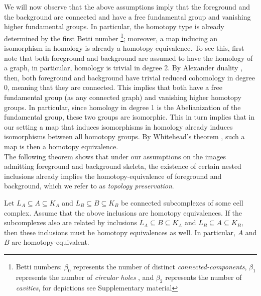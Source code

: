 

We will now observe that the above assumptions imply that the foreground and the background are connected and have a free fundamental group and vanishing higher fundamental groups.
In particular, the homotopy type is already determined by the first Betti number \footnote{Betti numbers:
	$\beta_0$ represents the number of distinct \textit{connected-components},
	$\beta_1$ represents the number of \textit{circular holes}%
	, and
	$\beta_2$ represents the number of \textit{cavities}, for depictions see Supplementary material }; moreover, a map inducing an isomorphism in homology is already a homotopy equivalence.
To see this, first note that both foreground and background are assumed to have the homology of a graph, in particular, homology is trivial in degree 2.
By Alexander duality \cite{aleksandrov1998combinatorial}, then, both foreground and background have trivial reduced cohomology in degree 0, meaning that they are connected.
This implies that both have a free fundamental group (as any connected graph) and vanishing higher homotopy groups.
In particular, since homology in degree 1 is the Abelianization of the fundamental group, these two groups are isomorphic.
This in turn implies that in our setting a map that induces isomorphisms in homology already induces isomorphisms between all homotopy groups.
By Whitehead's theorem \cite{whitehead1949combinatorial}, such a map is then a homotopy equivalence.\\

The following theorem shows that under our assumptions on the images admitting foreground and background skeleta, the existence of certain nested inclusions already implies the homotopy-equivalence of foreground and background, which we refer to as \emph{topology preservation}.

\begin{theorem}
	\label{thm2}
	Let $L_A \subseteq A \subseteq K_A$ 
	and $L_B \subseteq B \subseteq K_B$
	be connected subcomplexes of some cell complex.
	Assume that the above inclusions
	are homotopy equivalences.
	If the subcomplexes also are related by inclusions
	$L_A \subseteq B \subseteq K_A$ 
	and $L_B \subseteq A \subseteq K_B$, then these inclusions must be homotopy equivalences as well.
	In particular, $A$ and $B$ are homotopy-equivalent.
\end{theorem}

